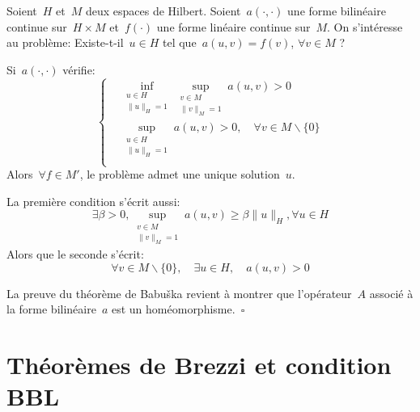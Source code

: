 \begin{theoreme}
Soient~$H$ et~$M$ deux espaces de Hilbert.
Soient~$a(\cdot,\cdot)$ une forme bilinéaire continue sur~$H \times M$ et~$f(\cdot)$ une forme linéaire continue sur~$M$.
On s'intéresse au problème: Existe-t-il~$u\in H$ tel que~$a(u,v)=f(v)$, $\forall v\in M$ ?

Si~$a(\cdot,\cdot)$ vérifie:
\begin{equation}\left\{
\begin{aligned}
&\displaystyle\inf_{\substack{u\in H\\\|u\|_H=1}} \sup_{\substack{v\in M\\\|v\|_M=1}} a(u,v) > 0\\[+2mm]
&\displaystyle\sup_{\substack{u\in H\\\|u\|_H=1}} a(u,v) > 0, \quad\forall v\in M\backslash\{0\}\\
\end{aligned}\right.
\end{equation}
Alors~$\forall f\in M'$, le problème admet une unique solution~$u$.
\end{theoreme}

\medskip
La première condition s'écrit aussi:
\begin{equation}
\exists \beta > 0, \sup_{\substack{v\in M\\\|v\|_M=1}} a(u,v) \ge \beta \|u\|_H, \forall u\in H
\end{equation}
Alors que le seconde s'écrit:
\begin{equation}
\forall v\in M\backslash\{0\},\quad \exists u\in H,\quad a(u,v)>0
\end{equation}

\begin{demonstration}\footnotesize{}
La preuve du théorème de Babuška revient à montrer que l'opérateur~$A$ associé à la forme bilinéaire~$a$ est un homéomorphisme.~$\square$
\end{demonstration}

\medskip%
\section{Théorèmes de Brezzi et condition BBL}\label{Sec-ThBrezzi}

